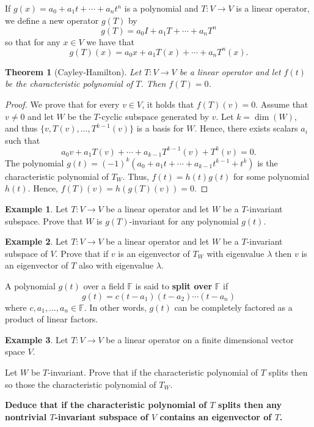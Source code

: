 \documentclass[12pt]{article}
\newcommand{\tv}{T:V\rightarrow V}
\newtheorem{theorem}{Theorem}[section]
\theoremstyle{definition}
\newtheorem{example}{Example}[section]
\begin{document}
If $g(x) = a_0 + a_1t + \cdots + a_n t^n$ is a polynomial and $\tv$ is a linear operator, we define a new operator $g(T)$ by
\[
g(T) = a_0I + a_1 T + \cdots + a_n T^n
\]
so that for any $x\in V$ we have that
\[
g(T)(x) = a_0x + a_1 T(x) + \cdots + a_n T^n(x).
\]

\begin{theorem}[Cayley-Hamilton]
Let $\tv$ be a linear operator and let $f(t)$ be the characteristic polynomial of $T$.  Then $f(T)=0$.
\end{theorem}
\begin{proof}
We prove that for every $v\in V$, it holds that $f(T)(v)=0$.  Assume that $v\neq 0$ and let $W$ be the $T$-cyclic subspace generated by $v$.  Let $k=\dim(W)$, and thus $\{v,T(v),\ldots,T^{k-1}(v)\}$ is a basis for $W$.  Hence, there exists scalars $a_i$ such that
\[
a_0v + a_1 T(v) + \cdots + a_{k-1}T^{k-1}(v) + T^k(v)=0.
\]
The polynomial $g(t)=(-1)^k(a_0+a_1t+\cdots + a_{k-1}t^{k-1}+t^k)$ is the characteristic polynomial of $T_W$.  Thus, $f(t)=h(t)g(t)$ for some polynomial $h(t)$.  Hence, $f(T)(v)=h(g(T)(v))=0$.
\end{proof}


\begin{example}
Let $\tv$ be a linear operator and let $W$ be a $T$-invariant subspace.  Prove that $W$ is $g(T)$-invariant for any polynomial $g(t)$.
\end{example}

\begin{example}
Let $\tv$ be a linear operator and let $W$ be a $T$-invariant subspace of $V$.  Prove that if $v$ is an eigenvector of $T_W$ with eigenvalue $\lambda$ then $v$ is an eigenvector of $T$ also with eigenvalue $\lambda$.
\end{example}

A polynomial $g(t)$ over a field $\mathbb{F}$ is said to \textbf{split over} $\mathbb{F}$ if
\[
g(t) = c(t-a_1)(t-a_2)\cdots (t-a_n)
\]
where $c,a_1,\ldots,a_n \in \mathbb{F}$.  In other words, $g(t)$ can be completely factored as a product of linear factors. 

\begin{example}
Let $\tv$ be a linear operator on a finite dimensional vector space $V$.
\begin{compactenum}[(a)]
\item Let $W$ be $T$-invariant.  Prove that if the characteristic polynomial of $T$ splits then so those the characteristic polynomial of $T_W$.
\item \textbf{Deduce that if the characteristic polynomial of $T$ splits then any nontrivial $T$-invariant subspace of $V$ contains an eigenvector of $T$.}
\end{compactenum}
\end{example}
\end{document}
